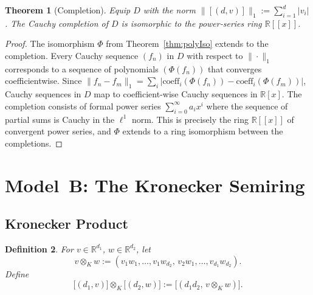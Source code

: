 \documentclass[11pt]{article}
\newtheorem{theorem}{Theorem}[section]
\newtheorem{definition}[theorem]{Definition}
\begin{document}
\begin{theorem}[Completion]\label{thm:completion}
Equip \(D\) with the norm \(\lVert[(d,v)]\rVert_1:=\sum_{i=1}^{d}|v_i|\).  The Cauchy completion of \(D\) is isomorphic to the power‑series ring \(\mathbb R[[x]]\).
\end{theorem}
\begin{proof}
The isomorphism $\Phi$ from Theorem~\ref{thm:polyIso} extends to the completion. Every Cauchy sequence $(f_n)$ in $D$ with respect to $\|\cdot\|_1$ corresponds to a sequence of polynomials $(\Phi(f_n))$ that converges coefficientwise. Since $\|f_n - f_m\|_1 = \sum_{i} |\text{coeff}_i(\Phi(f_n)) - \text{coeff}_i(\Phi(f_m))|$, Cauchy sequences in $D$ map to coefficient-wise Cauchy sequences in $\mathbb{R}[x]$. The completion consists of formal power series $\sum_{i=0}^{\infty} a_i x^i$ where the sequence of partial sums is Cauchy in the $\ell^1$ norm. This is precisely the ring $\mathbb{R}[[x]]$ of convergent power series, and $\Phi$ extends to a ring isomorphism between the completions.
\qedhere
\end{proof}

\section{Model B: The Kronecker Semiring}
\subsection{Kronecker Product}
\begin{definition}
For \(v\in\mathbb R^{d_1}\), \(w\in\mathbb R^{d_2}\), let
\[v\otimes_K w := (v_1w_1,\dots,v_1w_{d_2},\,v_2w_1,\dots,v_{d_1}w_{d_2}).\]
Define
\[\bigl[(d_1,v)\bigr]\otimes_K \bigl[(d_2,w)\bigr] := \bigl[(d_1d_2,\,v\otimes_K w)\bigr].\]
\end{definition}
\end{document}
